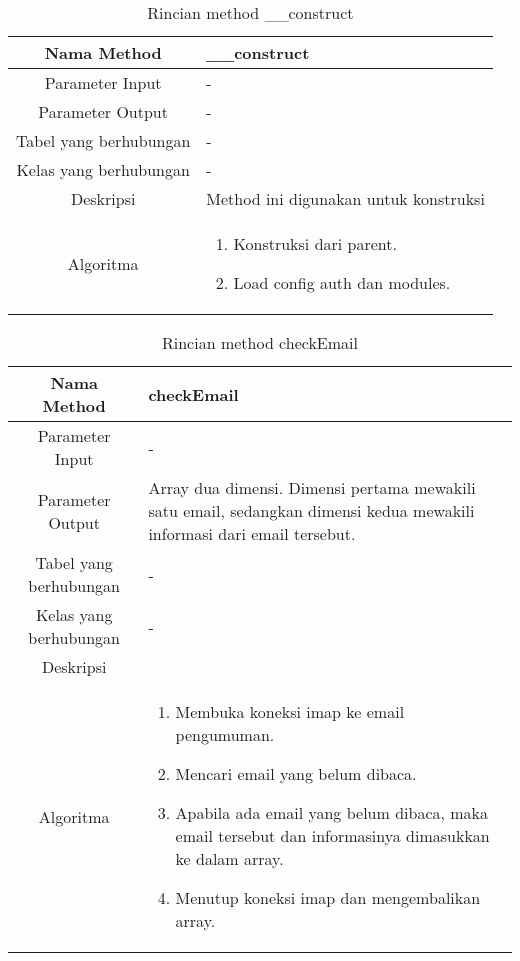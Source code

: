 \begin{center}
	\begin{table}[H]
	\caption{Rincian method \_\_construct}
	\label{table:pengumuman-model-construct}
\begin{tabular}{|c|p{11cm}|}
\hline
Nama Method 	& 	 	\_\_construct \\
\hline
Parameter Input & - \\
\hline
Parameter Output & - \\
\hline
Tabel yang berhubungan & -\\
\hline
Kelas yang berhubungan &  - \\
\hline
Deskripsi	& Method ini digunakan untuk konstruksi\\
\hline
Algoritma	& \begin{enumerate}
				\item Konstruksi dari parent.
				\item Load config auth dan modules.
				\end{enumerate} \\
\hline
\end{tabular}
\end{table}
\end{center}

\begin{center}
	\begin{table}[H]
	\caption{Rincian method checkEmail}
	\label{table:pengumuman-model-checkemail}
\begin{tabular}{|c|p{11cm}|}
\hline
Nama Method 	& 	 	checkEmail\\
\hline
Parameter Input & - \\
\hline
Parameter Output & Array dua dimensi. Dimensi pertama mewakili satu email, sedangkan dimensi kedua mewakili informasi dari email tersebut.\\
\hline
Tabel yang berhubungan & - \\
\hline
Kelas yang berhubungan & - \\
\hline
Deskripsi	& \\
\hline
Algoritma	& \begin{enumerate}
				\item Membuka koneksi imap ke email pengumuman.
				\item Mencari email yang belum dibaca.
				\item Apabila ada email yang belum dibaca, maka email tersebut dan informasinya dimasukkan ke dalam array.
				\item Menutup koneksi imap dan mengembalikan array.
				\end{enumerate} \\
\hline
\end{tabular}
\end{table}
\end{center}

